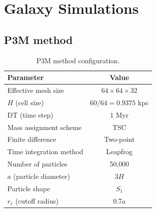 \section{Galaxy Simulations}

\subsection{P3M method}
\begin{table}[htp]
    \centering
    \begin{tabular}{|l|c|}
        \hline
        \textbf{Parameter}      & \textbf{Value}           \\
        \hline
        Effective mesh size     & $64 \times 64 \times 32$ \\
        $H$ (cell size)         & $60/64=0.9375$ kpc       \\
        DT (time step)          & $1$ Myr                  \\
        Mass assignment scheme  & TSC                      \\
        Finite difference       & Two-point                \\
        Time integration method & Leapfrog                 \\
        Number of particles     & 50,000                   \\
        $a$ (particle diameter) & $3H$                     \\
        Particle shape          & $S_1$                    \\
        $r_e$ (cutoff radius)   & $0.7a$                   \\
        \hline
    \end{tabular}
    \caption{P3M method configuration.}
    \label{tab:p3m-method-parameters}
\end{table}

